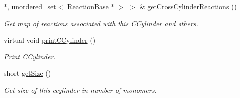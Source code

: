 \begin{DoxyCompactItemize}
$\ast$, unordered\+\_\+set$<$ \hyperlink{classReactionBase}{Reaction\+Base} $\ast$ $>$ $>$ \& \hyperlink{classCCylinder_aa1fd48d90a614bd82268367a548eb8d5}{get\+Cross\+Cylinder\+Reactions} ()
\begin{DoxyCompactList}\small\item\em Get map of reactions associated with this \hyperlink{classCCylinder}{C\+Cylinder} and others. \end{DoxyCompactList}\item 
virtual void \hyperlink{classCCylinder_a9c358ffc39c2503fc63d67333976bf69}{print\+C\+Cylinder} ()
\begin{DoxyCompactList}\small\item\em Print \hyperlink{classCCylinder}{C\+Cylinder}. \end{DoxyCompactList}\item 
short \hyperlink{classCCylinder_a1e45d32541c9fb3145803cfbf0f93566}{get\+Size} ()
\begin{DoxyCompactList}\small\item\em Get size of this ccylinder in number of monomers. \end{DoxyCompactList}\end{DoxyCompactItemize}
{\bf }\par
